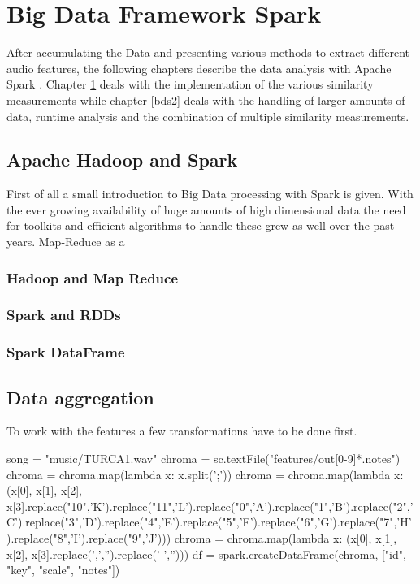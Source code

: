 
\chapter{Big Data Framework Spark}\label{bds1}

After accumulating the Data and presenting various methods to extract different audio features, the following chapters describe the data analysis with Apache Spark \cite{spark}. Chapter \ref{bds1} deals with the implementation of the various similarity measurements while chapter \ref{bds2} deals with the handling of larger amounts of data, runtime analysis and the combination of multiple similarity measurements. 

\section{Apache Hadoop and Spark} 

First of all a small introduction to Big Data processing with Spark is given.
With the ever growing availability of huge amounts of high dimensional data the need for toolkits and efficient algorithms to handle these grew as well over the past years. Map-Reduce as a 

\subsection{Hadoop and Map Reduce}


\subsection{Spark and RDDs}

\subsection{Spark DataFrame}

\section{Data aggregation}

To work with the features a few transformations have to be done first. 
\begin{pythonCode}
song = "music/TURCA1.wav"
chroma = sc.textFile("features/out[0-9]*.notes")
chroma = chroma.map(lambda x: x.split(';'))
chroma = chroma.map(lambda x: (x[0], x[1], x[2], x[3].replace("10",'K').replace("11",'L').replace("0",'A').replace("1",'B').replace("2",'C').replace("3",'D').replace("4",'E').replace("5",'F').replace("6",'G').replace("7",'H').replace("8",'I').replace("9",'J')))
chroma = chroma.map(lambda x: (x[0], x[1], x[2], x[3].replace(',','').replace(' ','')))
df = spark.createDataFrame(chroma, ["id", "key", "scale", "notes"])
\end{pythonCode}

